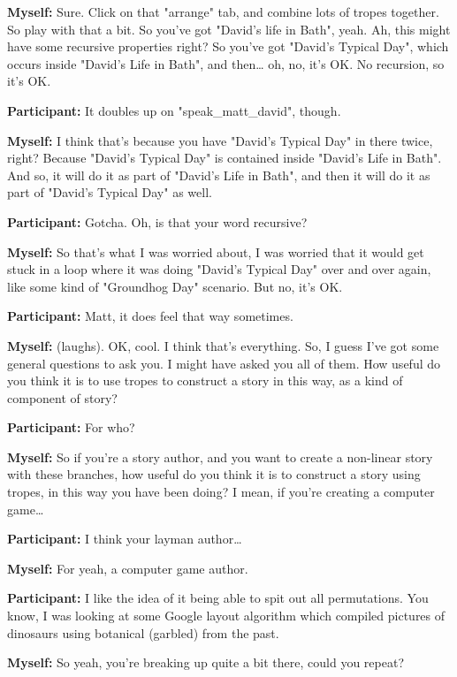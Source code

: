 \documentclass[11pt]{report}
\begin{document}
\begin{linenumbers}
\textbf{Myself:} Sure. Click on that "arrange" tab, and combine lots of tropes together. So play with that a bit. So you've got "David's life in Bath", yeah. Ah, this might have some recursive properties right? So you've got "David's Typical Day", which occurs inside "David's Life in Bath", and then\ldots{} oh, no, it's OK. No recursion, so it's OK.

\textbf{Participant:} It doubles up on "speak_matt_david", though.

\textbf{Myself:} I think that's because you have "David's Typical Day" in there twice, right? Because "David's Typical Day" is contained inside "David's Life in Bath". And so, it will do it as part of "David's Life in Bath", and then it will do it as part of "David's Typical Day" as well.

\textbf{Participant:} Gotcha. Oh, is that your word recursive?

\textbf{Myself:} So that's what I was worried about, I was worried that it would get stuck in a loop where it was doing "David's Typical Day" over and over again, like some kind of "Groundhog Day" scenario. But no, it's OK.

\textbf{Participant:} Matt, it does feel that way sometimes.

\textbf{Myself:} (laughs). OK, cool. I think that's everything. So, I guess I've got some general questions to ask you. I might have asked you all of them. How useful do you think it is to use tropes to construct a story in this way, as a kind of component of story?

\textbf{Participant:} For who?

\textbf{Myself:} So if you're a story author, and you want to create a non-linear story with these branches, how useful do you think it is to construct a story using tropes, in this way you have been doing? I mean, if you're creating a computer game\ldots{}

\textbf{Participant:} I think your layman author\ldots{}

\textbf{Myself:} For yeah, a computer game author.

\textbf{Participant:} I like the idea of it being able to spit out all permutations. You know, I was looking at some Google layout algorithm which compiled pictures of dinosaurs using botanical (garbled) from the past.

\textbf{Myself:} So yeah, you're breaking up quite a bit there, could you repeat?


\end{linenumbers}
\end{document}
